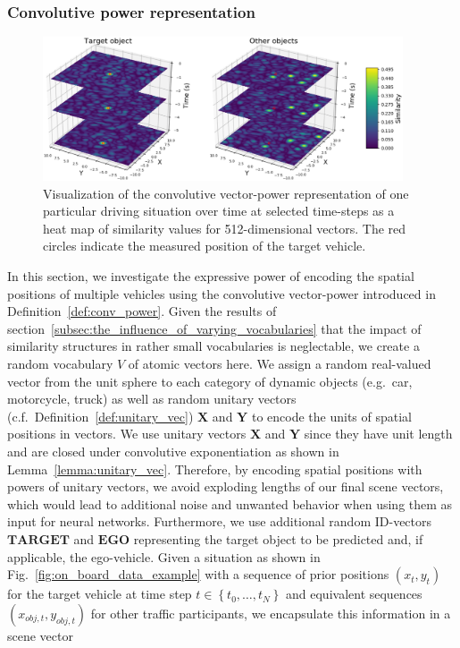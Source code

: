 \subsubsection{Convolutive power representation}%
\label{ssubsec:convolutive_power_representation}

\begin{figure}[t!]
  \centering
  \includegraphics[width=0.95\textwidth]{imgs/spa_power_representation_in_time_viridis.eps}
  \caption{Visualization of the convolutive vector-power representation of one particular driving situation over time at selected time-steps as a heat map of similarity values for \num{512}-dimensional vectors. 
  The red circles indicate the measured position of the target vehicle.}
  \label{fig:spa_power}
\end{figure}

In this section, we investigate the expressive power of encoding the spatial positions of multiple vehicles using the convolutive vector-power introduced in Definition~\ref{def:conv_power}.
Given the results of section~\ref{subsec:the_influence_of_varying_vocabularies} that the impact of similarity structures in rather small vocabularies is neglectable, we create a random vocabulary $V$ of atomic vectors here.
We assign a random real-valued vector from the unit sphere to each category of dynamic objects (e.g.\ car, motorcycle, truck) as well as random unitary vectors (c.f.\ Definition~\ref{def:unitary_vec}) $\mathbf{X}$ and $\mathbf{Y}$ to encode the units of spatial positions in vectors.
We use unitary vectors $\mathbf{X}$ and $\mathbf{Y}$ since they have unit length and are closed under convolutive exponentiation as shown in Lemma~\ref{lemma:unitary_vec}.
Therefore, by encoding spatial positions with powers of unitary vectors, we avoid exploding lengths of our final scene vectors, which would lead to additional noise and unwanted behavior when using them as input for neural networks.
Furthermore, we use additional random ID-vectors $\mathbf{TARGET}$ and $\mathbf{EGO}$ representing the target object to be predicted and, if applicable, the ego-vehicle.
Given a situation as shown in Fig.~\ref{fig:on_board_data_example} with a sequence of prior positions $(x_{t}, y_{t})$ for the target vehicle at time step $t \in \left\{t_{0}, \ldots, t_{N} \right\}$ and equivalent sequences $(x_{obj,t}, y_{obj,t})$ for other traffic participants, we encapsulate this information in a scene vector

